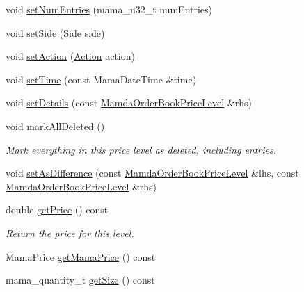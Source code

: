 \begin{CompactItemize}
void \hyperlink{classWombat_1_1MamdaOrderBookPriceLevel_7e6d1e53cd7f5ec1d8359d0760ddd09b}{set\-Num\-Entries} (mama\_\-u32\_\-t num\-Entries)
\item 
void \hyperlink{classWombat_1_1MamdaOrderBookPriceLevel_daf682cbf0f026e8261f5ce0b9bea0c1}{set\-Side} (\hyperlink{classWombat_1_1MamdaOrderBookPriceLevel_384c34b0a74d874b8969dee9b0d3718d}{Side} side)
\item 
void \hyperlink{classWombat_1_1MamdaOrderBookPriceLevel_76848ef7ad6690d93b9c23a660136ef2}{set\-Action} (\hyperlink{classWombat_1_1MamdaOrderBookPriceLevel_bd3407b4250fc6f7a42d94b6d32e358a}{Action} action)
\item 
void \hyperlink{classWombat_1_1MamdaOrderBookPriceLevel_edf661cde995fb8dd3f119d2ca7e28f3}{set\-Time} (const Mama\-Date\-Time \&time)
\item 
void \hyperlink{classWombat_1_1MamdaOrderBookPriceLevel_0cd6f5f488c07ec82512edff81c3fb6a}{set\-Details} (const \hyperlink{classWombat_1_1MamdaOrderBookPriceLevel}{Mamda\-Order\-Book\-Price\-Level} \&rhs)
\item 
void \hyperlink{classWombat_1_1MamdaOrderBookPriceLevel_f3f8d51f8b417aefb9a7df2e7c46328d}{mark\-All\-Deleted} ()
\begin{CompactList}\small\item\em Mark everything in this price level as deleted, including entries. \item\end{CompactList}\item 
void \hyperlink{classWombat_1_1MamdaOrderBookPriceLevel_cc06a4e859dbcb33b734b5702c7757e2}{set\-As\-Difference} (const \hyperlink{classWombat_1_1MamdaOrderBookPriceLevel}{Mamda\-Order\-Book\-Price\-Level} \&lhs, const \hyperlink{classWombat_1_1MamdaOrderBookPriceLevel}{Mamda\-Order\-Book\-Price\-Level} \&rhs)
\item 
double \hyperlink{classWombat_1_1MamdaOrderBookPriceLevel_7a7965a7898f85c98af6ee0d27399bed}{get\-Price} () const 
\begin{CompactList}\small\item\em Return the price for this level. \item\end{CompactList}\item 
Mama\-Price \hyperlink{classWombat_1_1MamdaOrderBookPriceLevel_f51f579cc10c5b537c4b9e07c9467ca0}{get\-Mama\-Price} () const 
\item 
mama\_\-quantity\_\-t \hyperlink{classWombat_1_1MamdaOrderBookPriceLevel_83c0889ecaab75f17606f933a4340dde}{get\-Size} () const 

\end{CompactItemize}
